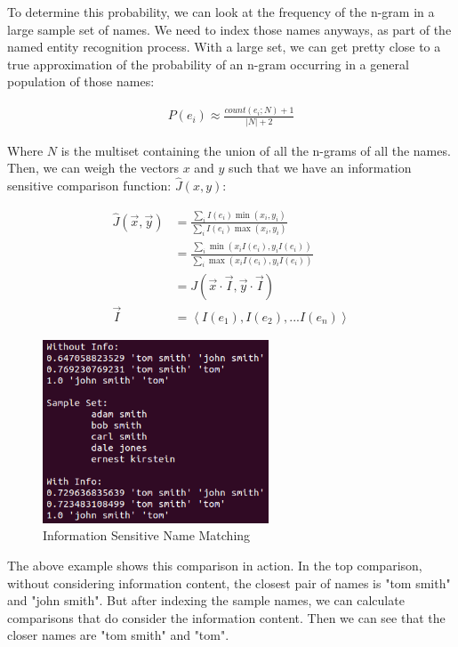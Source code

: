 \documentclass[11pt]{article}
\begin{document}
To determine this probability, we can look at the frequency
of the n-gram in a large sample set of names.
We need to index those names anyways, as part of the named entity
recognition process. With a large set, we can get pretty close to a true 
approximation of the probability of an n-gram occurring in 
a general population of those names:

\begin{align*}
P(e_i) \approx \frac{count(e_i; N)+1}{|N|+2}
\end{align*}

Where $N$ is the multiset containing the union of all the n-grams of
all the names. 
Then, we can weigh the vectors $x$ and $y$ such that we have
an information sensitive comparison function: $\hat{J}(x,y)$:

\begin{align*}
\hat{J}(\vec{x},\vec{y}) 
&= \frac{
    \sum_i I(e_i)\min(x_i, y_i)
}{
    \sum_i I(e_i)\max(x_i, y_i)
}\\
&= \frac{
    \sum_i \min(x_iI(e_i), y_iI(e_i))
}{
    \sum_i \max(x_iI(e_i), y_iI(e_i))
}\\
&= J\left(\vec{x} \cdot \vec{I}, \vec{y} \cdot \vec{I} \right)\\
\vec{I} &= \left< I(e_1), I(e_2), ... I(e_n) \right>
\end{align*}

\begin{figure}[h!]
    \centering
    \includegraphics[width=0.6\textwidth,natwidth=1,natheight=1]{imgs/info_comp.png}
    \caption{Information Sensitive Name Matching}
    \label{fig:lev_comp}
\end{figure}

The above example shows this comparison in action. In the top comparison,
without considering information content, the closest pair of names is
"tom smith" and "john smith". But after indexing the sample names, we
can calculate comparisons that do consider the information content. Then
we can see that the closer names are "tom smith" and "tom".
\end{document}
